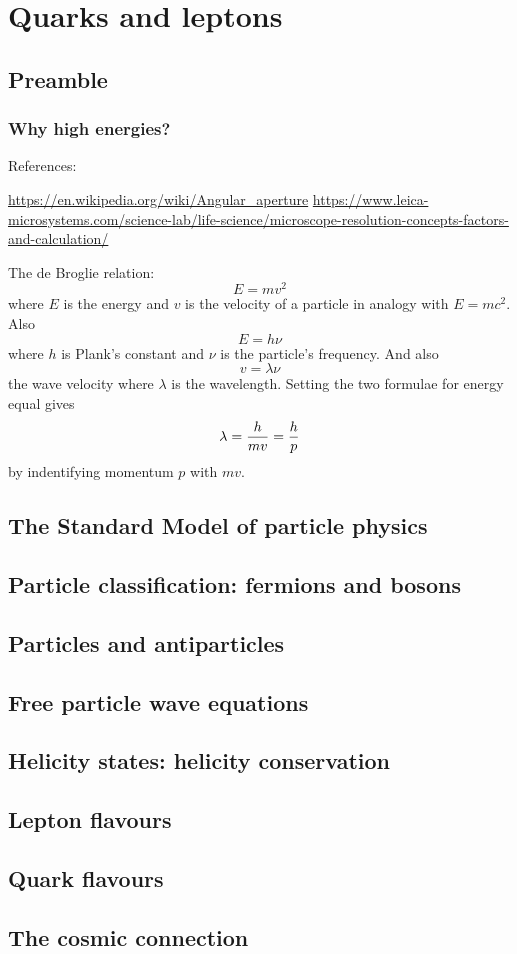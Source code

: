 \documentclass{book}
\begin{document}
\chapter{Quarks and leptons}

\section{Preamble}

\subsection{Why high energies?}

References:

\url{https://en.wikipedia.org/wiki/Angular\_aperture}
\url{https://www.leica-microsystems.com/science-lab/life-science/microscope-resolution-concepts-factors-and-calculation/}

The de Broglie relation:
$$
E = mv^2
$$
where $E$ is the energy and $v$ is the velocity of a particle in analogy with $E=mc^2$. Also
$$
E = h\nu
$$
where $h$ is Plank's constant and $\nu$ is the particle's frequency. And also
$$
v = \lambda\nu
$$
the wave velocity where $\lambda$ is the wavelength. Setting the two formulae for energy equal gives
$$
\lambda = {h \over mv} = {h \over p}
$$
by indentifying momentum $p$ with $mv$.

\section{The Standard Model of particle physics}
\section{Particle classification: fermions and bosons}
\section{Particles and antiparticles}
\section{Free particle wave equations}
\section{Helicity states: helicity conservation}
\section{Lepton flavours}
\section{Quark flavours}
\section{The cosmic connection}
\end{document}
